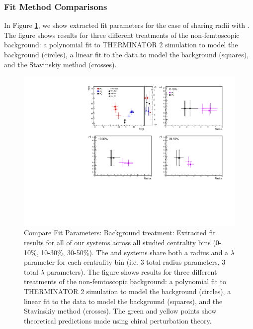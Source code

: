 \documentclass[/home/jesse/Analysis/FemtoAnalysis/AnalysisNotes/AnalysisNoteJBuxton.tex]{subfiles}
\begin{document}
\subsubsection{Fit Method Comparisons}
\label{ResultsLamK_FitMethComp}

In Figure \ref{fig:FitResults_ShareR_Sharelam_PolyBgd}, we show extracted fit parameters for the case of \LamKchPALamKchM sharing radii with \LamKchMALamKchP.  The figure shows results for three different treatments of the non-femtoscopic background: a polynomial fit to THERMINATOR 2 simulation to model the background (circles), a linear fit to the data to model the background (squares), and the Stavinskiy method (crosses).


\begin{figure}[h]
  \centering
  \includegraphics[width=\textwidth]{7_ResultsAndDiscussion/Figures/New/CompareAllScattParamswSys_Comp3An_LinrPolyStav_10fm_StatOnly.pdf}
  \caption[Compare Fit Parameters: Background treatment]{Compare Fit Parameters: Background treatment: Extracted fit results for all of our \LamALamKpm systems across all studied centrality bins (0-10\%, 10-30\%, 30-50\%).  The \LamKchPALamKchM and \LamKchMALamKchP systems share both a radius and a $\lambda$ parameter for each centrality bin (i.e. 3 total radius parameters, 3 total $\lambda$ parameters).  The figure shows results for three different treatments of the non-femtoscopic background: a polynomial fit to THERMINATOR 2 simulation to model the background (circles), a linear fit to the data to model the background (squares), and the Stavinskiy method (crosses).  The green \cite{Liu:2006xja} and yellow \cite{Mai:2009ce} points show theoretical predictions made using chiral perturbation theory.}
  \label{fig:FitResults_ShareR_Sharelam_PolyBgd}
\end{figure}
\end{document}
